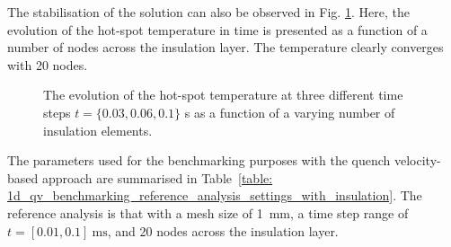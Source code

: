 The stabilisation of the solution can also be observed in Fig. \ref{fig: q_vel_modelling_v_quench_hot_spot_temp_with_insulation}. Here, the evolution of the hot-spot temperature in time is presented as a function of a number of nodes across the insulation layer. The temperature clearly converges with 20 nodes.

\begin{figure}[H]
\centering
    \caption{The evolution of the hot-spot temperature at three different time steps $t=\{0.03, 0.06, 0.1\}$ s as a function of a varying number of insulation elements.}
    \label{fig: q_vel_modelling_v_quench_hot_spot_temp_with_insulation}
\end{figure}

The parameters used for the benchmarking purposes with the quench velocity-based approach are summarised in Table~\ref{table: 1d_qv_benchmarking_reference_analysis_settings_with_insulation}. The reference analysis is that with a mesh size of 1~mm, a time step range of $t=[0.01, 0.1]~\text{ms}$, and 20 nodes across the insulation layer. 

